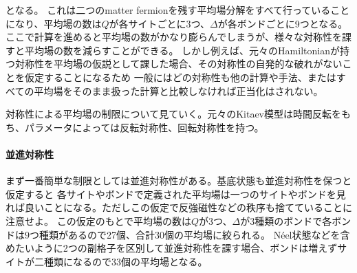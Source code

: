\documentclass[11pt, aps, longbibliography]{article}
\begin{document}
        となる。
        これは二つのmatter fermionを残す平均場分解をすべて行っていることになり、平均場の数は$Q$が各サイトごとに3つ、$\Delta$が各ボンドごとに9つとなる。
        ここで計算を進めると平均場の数がかなり膨らんでしまうが、様々な対称性を課すと平均場の数を減らすことができる。
        しかし例えば、元々のHamiltonianが持つ対称性を平均場の仮説として課した場合、その対称性の自発的な破れがないことを仮定することになるため
        一般にはどの対称性も他の計算や手法、またはすべての平均場をそのまま扱った計算と比較しなければ正当化はされない。

        対称性による平均場の制限について見ていく。元々のKitaev模型は時間反転をもち、パラメータによっては反転対称性、回転対称性を持つ。
        \paragraph{並進対称性}
        まず一番簡単な制限としては並進対称性がある。基底状態も並進対称性を保つと仮定すると
        各サイトやボンドで定義された平均場は一つのサイトやボンドを見れば良いことになる。ただしこの仮定で反強磁性などの秩序も捨てていることに注意せよ。
        この仮定のもとで平均場の数は$Q$が3つ、$\Delta$が3種類のボンドで各ボンドは$9$つ種類があるので27個、合計30個の平均場に絞られる。
        Néel状態などを含めたいように2つの副格子を区別して並進対称性を課す場合、ボンドは増えずサイトが二種類になるので33個の平均場となる。
\end{document}
